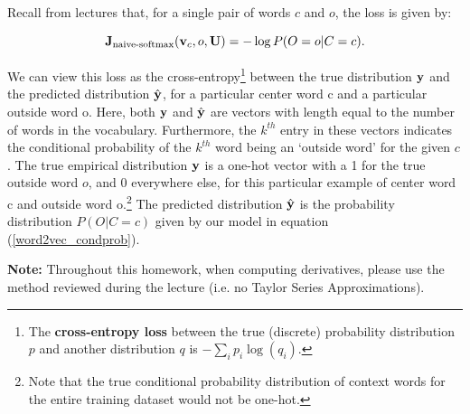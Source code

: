 Recall from lectures that, for a single pair of words $c$ and $o$, the loss is given by:

\begin{equation} 
\mathbf{J}_{\text{naive-softmax}}(\mathbf{v}_c, o, \mathbf{U}) = -\log P(O=o| C=c).
\label{naive-softmax}
\end{equation}

We can view this loss as the cross-entropy\footnote{The \textbf{cross-entropy loss} between the true (discrete) probability distribution $p$ and another distribution $q$ is $-\sum_i p_i \log(q_i)$.} between the true distribution $\mathbf{y}$ and the predicted distribution $\hat{\mathbf{y}}$, for a particular center word c and a particular outside word o. 
Here, both $\mathbf{y}$ and $\hat{\mathbf{y}}$ are vectors with length equal to the number of words in the vocabulary.
Furthermore, the $k^{th}$ entry in these vectors indicates the conditional probability of the $k^{th}$ word being an `outside word' for the given $c$. 
The true empirical distribution $\mathbf{y}$ is a one-hot vector with a 1 for the true outside word $o$, and 0 everywhere else, for this particular example of center word c and outside word o.\footnote{Note that the true conditional probability distribution of context words for the entire training dataset would not be one-hot.}
The predicted distribution $\hat{\mathbf{y}}$ is the probability distribution $P(O|C=c)$ given by our model in equation (\ref{word2vec_condprob}). \newline

\textbf{Note:} Throughout this homework, when computing derivatives, please use the method reviewed during the lecture (i.e. no Taylor Series Approximations).


